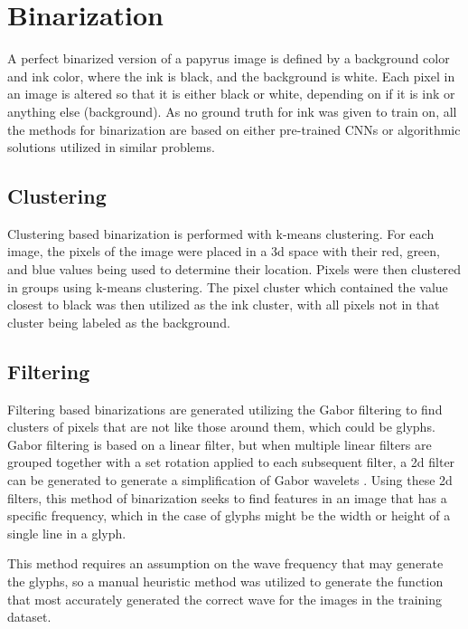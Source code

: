 \section{Binarization}

A perfect binarized version of a papyrus image is defined by a background color and ink color, where the ink is black, and the background is white. Each pixel in an image is altered so that it is either black or white, depending on if it is ink or anything else (background). As no ground truth for ink was given to train on, all the methods for binarization are based on either pre-trained CNNs or algorithmic solutions utilized in similar problems.

\subsection{Clustering}

Clustering based binarization is performed with k-means clustering. For each image, the pixels of the image were placed in a 3d space with their red, green, and blue values being used to determine their location. Pixels were then clustered in groups using k-means clustering. The pixel cluster which contained the value closest to black was then utilized as the ink cluster, with all pixels not in that cluster being labeled as the background.

\subsection{Filtering}

Filtering based binarizations are generated utilizing the Gabor filtering  \cite{Gabor1949, Gabor1948} to find clusters of pixels that are not like those around them, which could be glyphs. Gabor filtering is based on a linear filter, but when multiple linear filters are grouped together with a set rotation applied to each subsequent filter, a 2d filter can be generated to generate a simplification of Gabor wavelets \cite{Gabor1949, Gabor1948}. Using these 2d filters, this method of binarization seeks to find features in an image that has a specific frequency, which in the case of glyphs might be the width or height of a single line in a glyph.

This method requires an assumption on the wave frequency that may generate the glyphs, so a manual heuristic method was utilized to generate the function that most accurately generated the correct wave for the images in the training dataset.

